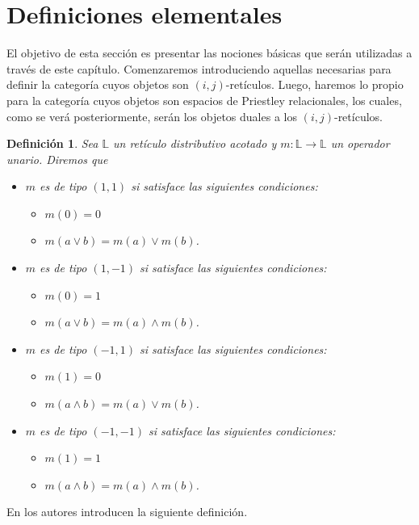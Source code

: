\documentclass[12pt]{book}
\newtheorem{definition}[theorem]{Definición}
\begin{document}
\section{Definiciones elementales}

El objetivo de esta sección es presentar las nociones básicas que serán utilizadas a través de este capítulo. Comenzaremos introduciendo aquellas necesarias para definir la categoría cuyos objetos son $(i,j)$-retículos. Luego, haremos lo propio para la categoría cuyos objetos son espacios de Priestley relacionales, los cuales, como se verá posteriormente, serán los objetos duales a los $(i,j)$-retículos.
 

\begin{definition} \label{def tipos} Sea $\mathbb{L}$ un retículo distributivo acotado y $m:\mathbb{L}\to \mathbb{L}$ un operador unario. Diremos que
\begin{itemize}
\item[1.] $m$ es de tipo $(1,1)$ si satisface las siguientes condiciones:
\begin{itemize}
\item[a.] $m(0) = 0$
\item[b.] $m(a \vee b) = m(a) \vee m(b)$.
\end{itemize}
\item[2.] $m$ es de tipo $(1,-1)$ si satisface las siguientes condiciones:
\begin{itemize}
\item[c.] $m(0) = 1$
\item[d.] $m(a \vee b) = m(a) \wedge m(b)$.
\end{itemize}
\item[3.] $m$ es de tipo $(-1,1)$ si satisface las siguientes condiciones:
\begin{itemize}
\item[e.] $m(1) = 0$
\item[f.] $m(a \wedge b) = m(a) \vee m(b)$.
\end{itemize}
\item[4.] $m$ es de tipo $(-1,-1)$ si satisface las siguientes condiciones:
\begin{itemize}
\item[g.] $m(1) = 1$
\item[h.] $m(a \wedge b) = m(a) \wedge m(b)$.
\end{itemize}
\end{itemize}
\end{definition}

En \cite[Seccion 1]{CLP} los autores introducen la siguiente definición.
\end{document}
